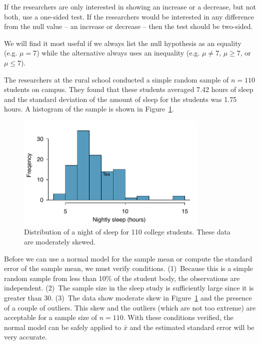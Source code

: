 \begin{tipBox}{
If the researchers are only interested in showing an increase or a decrease, but not both, use a one-sided test. If the researchers would be interested in any difference from the null value -- an increase or decrease -- then the test should be two-sided.\vspace{0.5mm}}
\end{tipBox}

\begin{tipBox}{
We will find it most useful if we always list the null hypothesis as an equality (e.g. $\mu = 7$) while the alternative always uses an inequality (e.g. $\mu\neq7$, $\mu \geq7$, or $\mu \leq7$).}
\end{tipBox}

The researchers at the rural school conducted a simple random sample of $n=110$ students on campus. They found that these students averaged 7.42 hours of sleep and the standard deviation of the amount of sleep for the students was 1.75 hours. A histogram of the sample is shown in Figure~\ref{histOfSleepForCollegeThatWasCheckingForMoreThan7Hours}.

\begin{figure}
\centering
\includegraphics[height=55mm]{ch_inference_foundations_oi_biostat/figures/histOfSleepForCollegeThatWasCheckingForMoreThan7Hours/histOfSleepForCollegeThatWasCheckingForMoreThan7Hours}
\caption{Distribution of a night of sleep for 110 college students. These data are moderately skewed.}
\label{histOfSleepForCollegeThatWasCheckingForMoreThan7Hours}
\end{figure}

Before we can use a normal model for the sample mean or compute the standard error of the sample mean, we must verify conditions. (1)~Because this is a simple random sample from less than 10\% of the student body, the observations are independent. (2)~The sample size in the sleep study is sufficiently large since it is greater than 30. (3)~The data show moderate skew in Figure~\ref{histOfSleepForCollegeThatWasCheckingForMoreThan7Hours} and the presence of a couple of outliers. This skew and the outliers (which are not too extreme) are acceptable for a sample size of $n=110$. With these conditions verified, the normal model can be safely applied to $\bar{x}$ and the estimated standard error will be very accurate.

